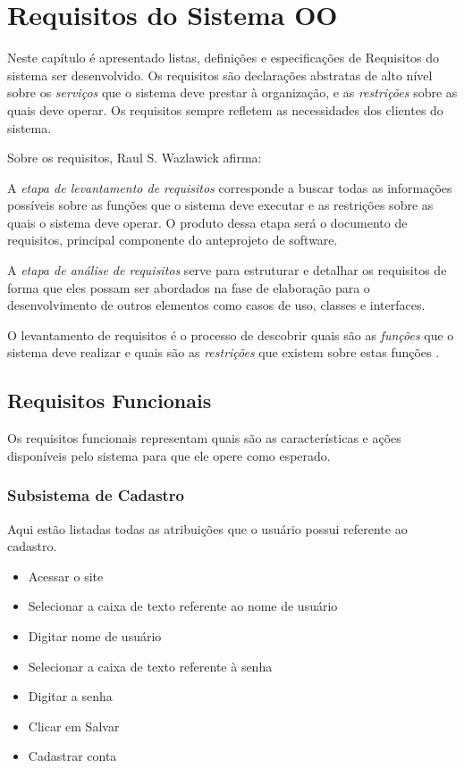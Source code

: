 
\chapter{Requisitos do Sistema OO}

Neste capítulo é apresentado listas, definições e especificações de Requisitos do sistema ser desenvolvido. Os requisitos são declarações abstratas de alto nível sobre os \textit{serviços} que o sistema deve prestar à organização, e as \textit{restrições} sobre as quais deve operar. Os requisitos sempre refletem as necessidades dos clientes do sistema.

Sobre os requisitos, Raul S. Wazlawick afirma:

\begin{citadireta}
    A \textit{etapa de levantamento de requisitos} corresponde a buscar todas as informações possíveis sobre as funções que o sistema deve executar e as restrições sobre as quais o sistema deve operar. O produto dessa etapa será o documento de requisitos, principal componente do anteprojeto de software.
    
    A \textit{etapa de análise de requisitos} serve para estruturar e detalhar os requisitos de forma que eles possam ser abordados na fase de elaboração para o desenvolvimento de outros elementos como casos de uso, classes e interfaces.
    
    O levantamento de requisitos é o processo de descobrir quais são as \textit{funções} que o sistema deve realizar e quais são as \textit{restrições} que existem sobre estas funções \cite{Wazlawick2011}.
\end{citadireta}

\section{Requisitos Funcionais}

    Os requisitos funcionais representam quais são as características e ações disponíveis pelo sistema para que ele opere como esperado.

    \subsection{Subsistema de Cadastro}
        Aqui estão listadas todas as atribuições que o usuário possui referente ao cadastro. 
        \begin{itemize}
            \item Acessar o site
            \item Selecionar a caixa de texto referente ao nome de usuário
            \item Digitar nome de usuário
            \item Selecionar a caixa de texto referente à senha
            \item Digitar a senha
            \item Clicar em Salvar
            \item Cadastrar conta
        \end{itemize}
